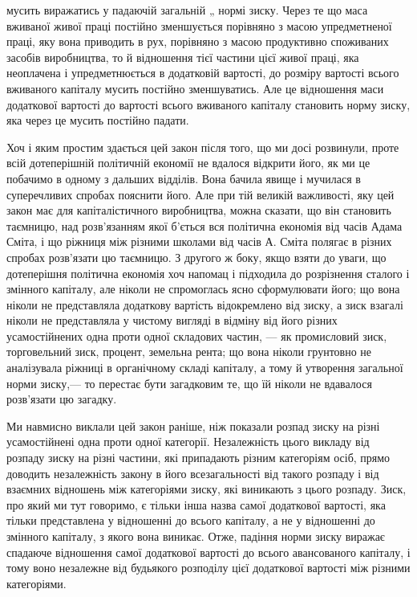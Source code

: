 \documentclass[12pt, a4paper, final]{memoir}
\begin{document}
мусить виражатись у падаючій загальній „ нормі зиску. Через те що маса вживаної живої праці постійно зменшується порівняно з масою упредметненої праці, яку вона приводить в рух, порівняно з масою продуктивно споживаних засобів виробництва, то й відношення тієї частини цієї живої праці, яка неоплачена і упредметнюється в додатковій вартості, до розміру вартості всього вживаного капіталу мусить постійно зменшуватись. Але це відношення маси додаткової вартості до вартості всього вживаного капіталу становить норму зиску, яка через це мусить постійно падати.

Хоч і яким простим здається цей закон після того, що ми досі розвинули, проте всій дотеперішній політичній економії не вдалося відкрити його, як ми це побачимо в одному з дальших відділів. Вона бачила явище і мучилася в суперечливих спробах пояснити його. Але при тій великій важливості, яку цей закон має для капіталістичного виробництва, можна сказати, що він становить таємницю, над розв’язанням якої б’ється вся політична економія від часів Адама Сміта, і що ріжниця між різними школами від часів А. Сміта полягає в різних спробах розв’язати цю таємницю. З другого ж боку, якщо взяти до уваги, що дотеперішня політична економія хоч напомац і підходила до розрізнення сталого і змінного капіталу, але ніколи не спромоглась ясно сформулювати його; що вона ніколи не представляла додаткову вартість відокремлено від зиску, а зиск взагалі ніколи не представляла у чистому вигляді в відміну від його різних усамостійнених одна проти одної складових частин, — як промисловий зиск, торговельний зиск, процент, земельна рента; що вона ніколи грунтовно не аналізувала ріжниці в органічному складі капіталу, а тому й утворення загальної норми зиску,— то перестає бути загадковим те, що їй ніколи не вдавалося розв’язати цю загадку.

Ми навмисно виклали цей закон раніше, ніж показали розпад зиску на різні усамостійнені одна проти одної категорії. Незалежність цього викладу від розпаду зиску на різні частини, які припадають різним категоріям осіб, прямо доводить незалежність закону в його всезагальності від такого розпаду і від взаємних відношень між категоріями зиску, які виникають з цього розпаду. Зиск, про який ми тут говоримо, є тільки інша назва самої додаткової вартості, яка тільки представлена у відношенні до всього капіталу, а не у відношенні до змінного капіталу, з якого вона виникає. Отже, падіння норми зиску виражає спадаюче відношення самої додаткової вартості до всього авансованого капіталу, і тому воно незалежне від будьякого розподілу цієї додаткової вартості між різними категоріями.
\end{document}
